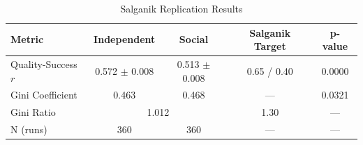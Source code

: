 \begin{table}[H]
\centering
\caption{Salganik Replication Results}
\label{tab:salganik_results}
\begin{tabular}{@{}lcccc@{}}
\toprule
\textbf{Metric} & \textbf{Independent} & \textbf{Social} & \textbf{Salganik Target} & \textbf{p-value} \\
\midrule
Quality-Success $r$ & 0.572 $\pm$ 0.008 & 0.513 $\pm$ 0.008 & 0.65 / 0.40 & 0.0000 \\
Gini Coefficient & 0.463 & 0.468 & --- & 0.0321 \\
Gini Ratio & \multicolumn{2}{c}{1.012} & 1.30 & --- \\
N (runs) & 360 & 360 & --- & --- \\
\bottomrule
\end{tabular}
\end{table}